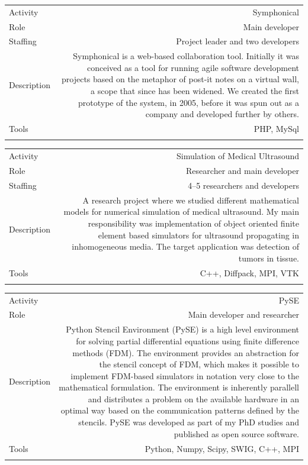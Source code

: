 \documentclass[english,a4paper,11pt]{article}
\begin{document}
\begin{tabular}{@{}LR}
Activity & Symphonical \\
Role & Main developer \\
Staffing & Project leader and two developers \\
Description & Symphonical is a web-based collaboration tool. Initially it was conceived as a tool for running agile software development projects based on the metaphor of post-it notes on a virtual wall, a scope that since has been widened. We created the first prototype of the system, in 2005, before it was spun out as a company and developed further by others. \\
Tools & PHP, MySql \\ 
\addlinespace \bottomrule[.1pt] \addlinespace
\end{tabular}

\begin{tabular}{@{}LR}
Activity & Simulation of Medical Ultrasound \\
Role & Researcher and main developer \\
Staffing & 4--5 researchers and developers \\
Description & A research project where we studied different mathematical models for numerical simulation of medical ultrasound. My main responsibility was implementation of object oriented finite element based simulators for ultrasound propagating in inhomogeneous media. The target application was detection of tumors in tissue. \\
Tools & C++, Diffpack, MPI, VTK \\ 
\addlinespace \bottomrule[.1pt] \addlinespace
\end{tabular}

\begin{tabular}{@{}LR}
Activity & PySE \\
Role & Main developer and researcher \\
Description & Python Stencil Environment (PySE) is a high level environment for solving partial differential equations using finite difference methods (FDM). The environment provides an abstraction for the stencil concept of FDM, which makes it possible to implement FDM-based simulators in notation very close to the mathematical formulation. The environment is inherently parallell and distributes a problem on the available hardware in an optimal way based on the communication patterns defined by the stencils. PySE was developed as part of my PhD studies and published as open source software.\\
Tools & Python, Numpy, Scipy, SWIG, C++, MPI \\ 
\addlinespace \bottomrule[.1pt] \addlinespace
\end{tabular}
\end{document}
